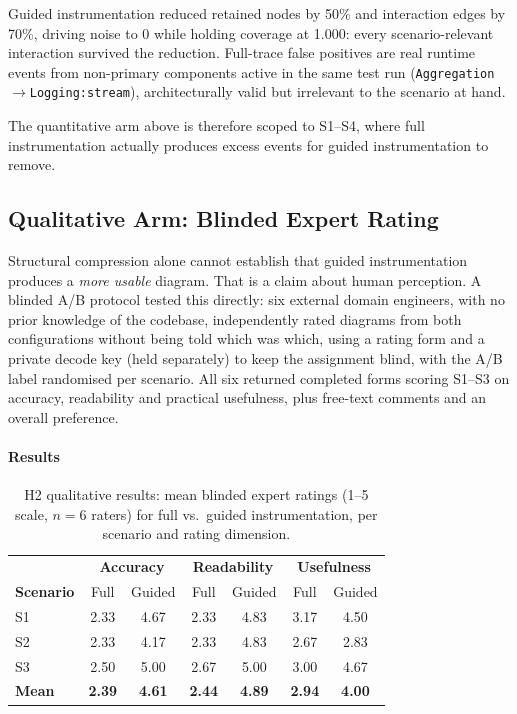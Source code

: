 Guided instrumentation reduced retained nodes by 50\% and interaction
edges by 70\%, driving noise to 0 while holding coverage at 1.000: every
scenario-relevant interaction survived the reduction. Full-trace false
positives are real runtime events from non-primary components active in
the same test run (\eg \texttt{Aggregation$\to$Logging:stream}),
architecturally valid but irrelevant to the scenario at hand.

The quantitative arm above is therefore scoped
to S1--S4, where full instrumentation actually produces excess events
for guided instrumentation to remove.

\subsection{Qualitative Arm: Blinded Expert Rating}\label{sec:h2-qual}

Structural compression alone cannot establish that guided instrumentation
produces a \emph{more usable} diagram. That is a claim about human
perception. A blinded A/B protocol tested this directly: six external
domain engineers, with no prior knowledge of the codebase, independently
rated diagrams from both configurations without being told which was
which, using a rating form and a private decode key (held separately) to
keep the assignment blind, with the A/B label randomised per scenario.
All six returned completed forms scoring S1--S3 on accuracy, readability
and practical usefulness, plus free-text comments and an overall
preference.

\paragraph{Results}

\begin{table}[htb]
\centering
\caption{H2 qualitative results: mean blinded expert ratings (1--5 scale,
  $n=6$ raters) for full vs.\ guided instrumentation, per scenario and
  rating dimension.}
\label{tab:h2-qual-results}
\begin{tabular}{@{} l cc cc cc @{}}
\toprule
 & \multicolumn{2}{c}{\textbf{Accuracy}} & \multicolumn{2}{c}{\textbf{Readability}} & \multicolumn{2}{c}{\textbf{Usefulness}} \\
\textbf{Scenario} & Full & Guided & Full & Guided & Full & Guided \\
\midrule
S1 & 2.33 & 4.67 & 2.33 & 4.83 & 3.17 & 4.50 \\
S2 & 2.33 & 4.17 & 2.33 & 4.83 & 2.67 & 2.83 \\
S3 & 2.50 & 5.00 & 2.67 & 5.00 & 3.00 & 4.67 \\
\midrule
\textbf{Mean} & \textbf{2.39} & \textbf{4.61} & \textbf{2.44} & \textbf{4.89} & \textbf{2.94} & \textbf{4.00} \\
\bottomrule
\end{tabular}
\end{table}


